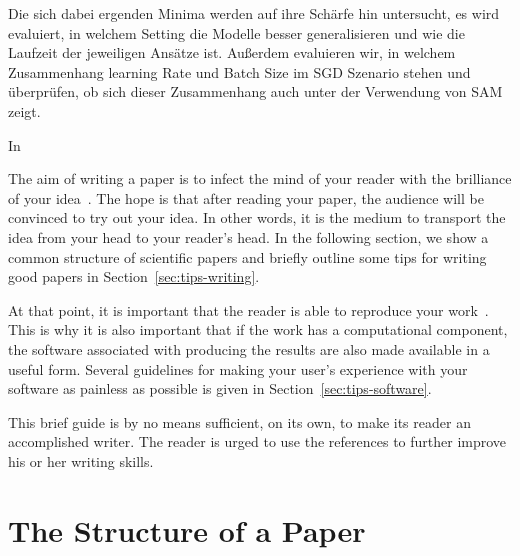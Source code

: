\documentclass[10pt,conference,compsocconf]{IEEEtran}
\begin{document}
Die sich dabei ergenden Minima werden auf ihre Schärfe hin untersucht, es wird evaluiert, in welchem Setting die Modelle besser generalisieren und wie die Laufzeit der jeweiligen Ansätze ist. 
Außerdem evaluieren wir, in welchem Zusammenhang learning Rate und Batch Size im SGD Szenario stehen und überprüfen, ob sich dieser Zusammenhang auch unter der Verwendung von SAM zeigt. 
 
In \cite{keskar2017largebatch}




The aim of writing a paper is to infect the mind of your reader with the brilliance of your idea~\cite{jones08}. 
The hope is that after reading your
paper, the audience will be convinced to try out your idea. In other
words, it is the medium to transport the idea from your head to your
reader's head. 
In the following
section, we show a common structure of scientific papers and briefly
outline some tips for writing good papers in
Section~\ref{sec:tips-writing}.

At that
point, it is important that the reader is able to reproduce your
work~\cite{schwab00,wavelab,gentleman05}. This is why it is also
important that if the work has a computational component, the software
associated with producing the results are also made available in a
useful form. Several guidelines for making your user's experience with
your software as painless as possible is given in
Section~\ref{sec:tips-software}.

This brief guide is by no means sufficient, on its own, to
make its reader an accomplished writer. The reader is urged to use the
references to further improve his or her writing skills.

\section{The Structure of a Paper}
\label{sec:structure-paper}
\end{document}
